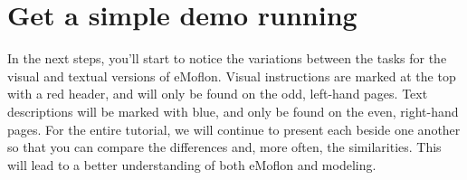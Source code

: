 \section{Get a simple demo running} %
\label{stepThree}

In the next steps, you'll start to notice the variations between the tasks for the visual and textual versions of eMoflon.
Visual instructions are marked at the top with a red header, and will only be found on the odd, left-hand pages. 
Text descriptions will be marked with blue, and only be found on the even, right-hand pages.
For the entire tutorial, we will continue to present each beside one another so that you can compare the 
differences and, more often, the similarities. This will lead to a better understanding of both eMoflon and modeling.

\visHeader

